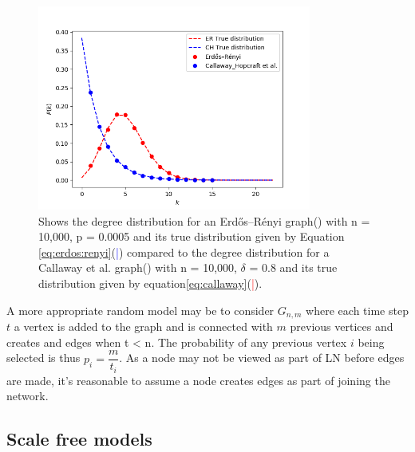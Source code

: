 \begin{figure}[!htb]
		\hspace*{-0.5cm} 
	\centering
	\includegraphics[width=9cm]{images/random_topology_degree_distribution.png}
	\caption{Shows the degree distribution for an Erdős–Rényi graph(\tikzcircle[blue, fill=blue]{2pt}) with n = 10,000, p = 0.0005 and its true distribution given by Equation \ref{eq:erdos:renyi}(\textcolor{blue}{|}) compared to the degree distribution for a Callaway et al. graph(\tikzcircle[red, fill=red]{2pt})  with n = 10,000, $\delta$ = 0.8 and its true distribution given by equation\ref{eq:callaway}(\textcolor{red}{|}).
	}
	\label{fig:fee_curve}
		\hspace*{2mm} 
\end{figure}

A more appropriate random model may be to consider $G_{n,m}$ where each time step $t$ a vertex is added to the graph and is connected with $m$ previous vertices and creates and edges when t < n. The probability of any previous vertex $i$ being selected is thus $p_i = \dfrac{m}{t_i}$. 
As a node may not be viewed as part of LN before edges are made, it's reasonable to assume a node creates edges as part of joining the network.




\subsection{Scale free models}

